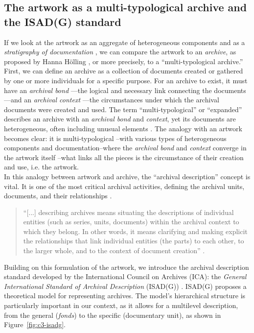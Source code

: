 \subsection{The artwork as a multi-typological archive and the ISAD(G) standard}
If we look at the artwork as an aggregate of heterogeneous components and as a \textit{stratigraphy of documentation} \cite{holling2016aesthetics}, we can compare the artwork to an \textit{archive}, as proposed by Hanna Hölling \cite{holling2017paik}, or more precisely, to a ``multi-typological archive.''\\
First, we can define an archive as a collection of documents created or gathered by one or more individuals for a specific purpose. For an archive to exist, it must have an \textit{archival bond} \cite{de1988archivio}—the logical and necessary link connecting the documents—and an \textit{archival context} \cite{pitti2003descrizione}—the circumstances under which the archival documents were created and used. The term ``multi-typological'' or ``expanded'' describes an archive with an \textit{archival bond} and \textit{context}, yet its documents are heterogeneous, often including unusual elements \cite{brunetti2018archivio}. The analogy with an artwork becomes clear: it is multi-typological –with various types of heterogeneous components and documentation–where the \textit{archival bond} and \textit{context} converge in the artwork itself –what links all the pieces is the circumstance of their creation and use, i.e. the artwork.\\
In this analogy between artwork and archive, the ``archival description'' concept is vital. It is one of the most critical archival activities, defining the archival units, documents, and their relationships \cite{brunetti2018archivio}.
\begin{quote}
“[...] describing archives means situating the descriptions of individual entities (such as series, units, documents) within the archival context to which they belong. In other words, it means clarifying and making explicit the relationships that link individual entities (the parts) to each other, to the larger whole, and to the context of document creation” \cite{vitali2000standard}.
\end{quote}
Building on this formulation of the artwork, we introduce the archival description standard developed by the International Council on Archives (ICA): the \textit{General International Standard of Archival Description} (ISAD(G)) \cite{ica1999general}. ISAD(G) proposes a theoretical model for representing archives. The model's hierarchical structure is particularly important in our context, as it allows for a multilevel description, from the general (\textit{fonds}) to the specific (documentary unit), as shown in Figure~\ref{fig:c3-isadg}.
